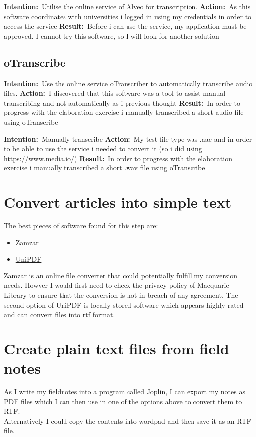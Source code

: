 \documentclass{article}
\newcommand{\intention}[1]{\textbf{Intention:}{\textnormal\ #1} \newline}
\newcommand{\action}[1]{\textbf{Action:}{\textnormal\ #1} \newline}
\newcommand{\result}[1]{\textbf{Result:}{\textnormal\ #1} \newline}
\begin{document}
\intention{Utilise the online service of Alveo for transcription.}
\action{As this software coordinates with universities i logged in using my credentials in order to access the service}
\result{Before i can use the service, my application must be approved. I cannot try this software, so I will look for another solution}

\subsection{oTranscribe}

\intention{Use the online service oTranscriber to automatically transcribe audio files.}
\action{I discovered that this software was a tool to assist manual transcribing and not automatically as i previous thought}
\result{In order to progress with the elaboration exercise i manually transcribed a short audio file using oTranscribe}

\intention{Manually transcribe}
\action{My test file type was .aac and in order to be able to use the service i needed to convert it (so i did using \url{https://www.media.io/})}
\result{In order to progress with the elaboration exercise i manually transcribed a short .wav file using oTranscribe}



\section{Convert articles into simple text}
The best pieces of software found for this step are:
\begin{itemize}
    \item \href{https://www.zamzar.com/}{Zamzar}
    \item \href{https://unipdf.com/}{UniPDF}
\end{itemize}
Zamzar is an online file converter that could potentially fulfill my conversion needs. Howver I would first need to check the privacy policy of Macquarie Library to ensure that the conversion is not in breach of any agreement. The second option of UniPDF is locally stored software which appears highly rated and can convert files into rtf format. 

\section{Create plain text files from field notes}
As I write my fieldnotes into a program called Joplin, I can export my notes as PDF files which I can then use in one of the options above to convert them to RTF.\\
\linebreak
Alternatively I could copy the contents into wordpad and then save it as an RTF file.
\end{document}

